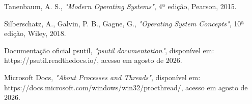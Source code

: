 \documentclass[12pt,a4paper]{article}
\begin{document}
\noindent [1] Tanenbaum, A. S., \textit{"Modern Operating Systems"}, 4ª edição, Pearson, 2015.

\noindent [2] Silberschatz, A., Galvin, P. B., Gagne, G., \textit{"Operating System Concepts"}, 10ª edição, Wiley, 2018.

\noindent [3] Documentação oficial psutil, \textit{"psutil documentation"}, disponível em: https://psutil.readthedocs.io/, acesso em agosto de 2026.

\noindent [4] Microsoft Docs, \textit{"About Processes and Threads"}, disponível em: https://docs.microsoft.com/windows/win32/procthread/, acesso em agosto de 2026.
\end{document}
